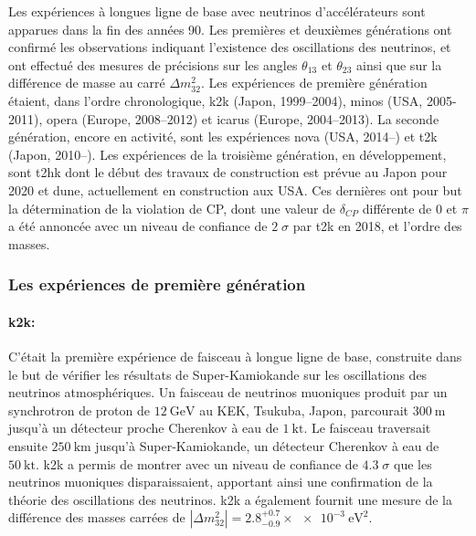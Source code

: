       Les expériences à longues ligne de base avec neutrinos d'accélérateurs sont apparues dans la fin des années 90. Les premières et deuxièmes générations ont confirmé les observations indiquant l'existence des oscillations des neutrinos, et ont effectué des mesures de précisions sur les angles $\theta_{13}$ et $\theta_{23}$ ainsi que sur la différence de masse au carré $\Delta m^2_{32}$\cite{pdg2018}. Les expériences de première génération étaient, dans l'ordre chronologique, \gls{k2k}\cite{Collaboration2006a} (Japon, 1999--2004), \gls{minos}\cite{Collaboration2014} (USA, 2005-2011), \gls{opera}\cite{Agafonova2018} (Europe, 2008--2012) et \gls{icarus} (Europe, 2004--2013). La seconde génération, encore en activité, sont les expériences \gls{nova}\cite{Adamson2016} (USA, 2014--) et \gls{t2k}\cite{Abe2018} (Japon, 2010--). Les expériences de la troisième génération, en développement, sont \gls{t2hk}\cite{HK2018} dont le début des travaux de construction est prévue au Japon pour  2020 et \gls{dune}\cite{Acciarri2016}, actuellement en construction aux USA. Ces dernières ont pour but la détermination de la violation de CP, dont une valeur de $\delta_{CP}$ différente de $0$ et $\pi$ a été annoncée avec un niveau de confiance de $2\;\sigma$ par \gls{t2k}\cite{Abe2018} en 2018, et l'ordre des masses.

      \subsubsection{Les expériences de première génération}

        \paragraph{\gls{k2k}\cite{Collaboration2006a}:} C'était la première expérience de faisceau à longue ligne de base, construite dans le but de vérifier les résultats de Super-Kamiokande sur les oscillations des neutrinos atmosphériques. Un faisceau de neutrinos muoniques produit par un synchrotron de proton de $\SI{12}{\giga\electronvolt}$ au KEK, Tsukuba, Japon, parcourait $\SI{300}{\meter}$ jusqu'à un détecteur proche Cherenkov à eau de $\SI{1}{\kilo\tonne}$. Le faisceau traversait ensuite $\SI{250}{\kilo\meter}$ jusqu'à Super-Kamiokande, un détecteur Cherenkov à eau de $\SI{50}{\kilo\tonne}$. \gls{k2k} a permis de montrer avec un niveau de confiance de $4.3\;\sigma$ que les neutrinos muoniques disparaissaient, apportant ainsi une confirmation de la théorie des oscillations des neutrinos. \gls{k2k} a également fournit une mesure de la différence des masses carrées de $|\Delta m^2_{32}|=2.8^{+0.7}_{-0.9}\times\SI{e-3}{\electronvolt\squared}$.


